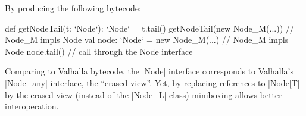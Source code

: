 By producing the following bytecode:

\begin{lstlisting-nobreak}
 def getNodeTail(t: `Node`): `Node` = t.tail()
 getNodeTail(new Node_M(...))                // Node_M impls Node
 val node: `Node` = new Node_M(...) // Node_M impls Node
 node.tail() // call through the Node interface
\end{lstlisting-nobreak}

Comparing to Valhalla bytecode, the |Node| interface corresponds to Valhalla's |Node_any| interface, the ``erased view''. Yet, by replacing references to |Node[T]| by the erased view (instead of the |Node_L| class) miniboxing allows better interoperation.

